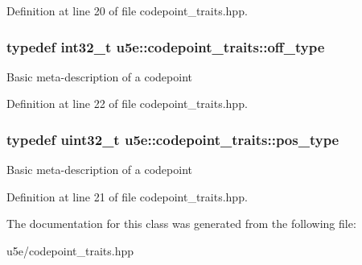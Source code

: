 Definition at line 20 of file codepoint\+\_\+traits.\+hpp.

\subsubsection[{\texorpdfstring{off\+\_\+type}{off_type}}]{\setlength{\rightskip}{0pt plus 5cm}typedef int32\+\_\+t {\bf u5e\+::codepoint\+\_\+traits\+::off\+\_\+type}}\hypertarget{classu5e_1_1codepoint__traits_ab169bad68f239d5248f82749a2962346}{}\label{classu5e_1_1codepoint__traits_ab169bad68f239d5248f82749a2962346}
Basic meta-\/description of a codepoint 

Definition at line 22 of file codepoint\+\_\+traits.\+hpp.

\subsubsection[{\texorpdfstring{pos\+\_\+type}{pos_type}}]{\setlength{\rightskip}{0pt plus 5cm}typedef uint32\+\_\+t {\bf u5e\+::codepoint\+\_\+traits\+::pos\+\_\+type}}\hypertarget{classu5e_1_1codepoint__traits_afb5588dd802b42f267a6c254ad7842f1}{}\label{classu5e_1_1codepoint__traits_afb5588dd802b42f267a6c254ad7842f1}
Basic meta-\/description of a codepoint 

Definition at line 21 of file codepoint\+\_\+traits.\+hpp.



The documentation for this class was generated from the following file\+:\begin{DoxyCompactItemize}
\item 
u5e/codepoint\+\_\+traits.\+hpp\end{DoxyCompactItemize}
